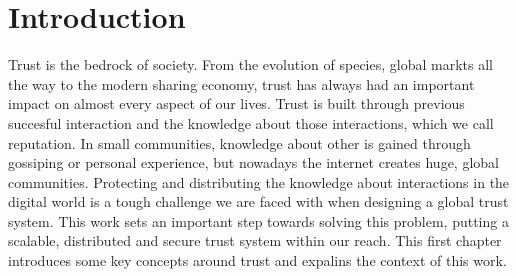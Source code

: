 \chapter{Introduction}
\label{chap:introduction}



Trust is the bedrock of society. From the evolution of species, global markts all the way to the 
modern sharing economy, trust has always had an important impact on almost every aspect of our lives.
Trust is built through previous succesful interaction and the knowledge about those interactions,
which we call reputation. In small communities, knowledge about other is gained through gossiping 
or personal experience, but nowadays the internet creates huge, global communities. Protecting and
distributing the knowledge about interactions in the digital world is a tough challenge we are faced
with when designing a global trust system. This work sets an important step towards solving this 
problem, putting a scalable, distributed and secure trust system within our reach. This first chapter 
introduces some key concepts around trust and expalins the context of this work.

